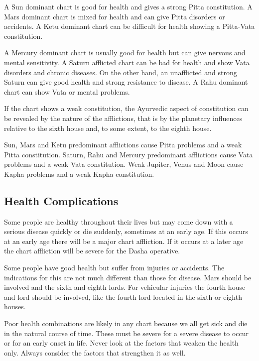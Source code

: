  

A Sun dominant chart is good for health and gives a strong Pitta constitution. A Mars dominant chart is mixed for health and can give Pitta disorders or accidents. A Ketu dominant chart can be difficult for health showing a Pitta-Vata constitution.

 

A Mercury dominant chart is usually good for health but can give nervous and mental sensitivity. A Saturn afflicted chart can be bad for health and show Vata disorders and chronic diseases. On the other hand, an unafflicted and strong Saturn can give good health and strong resistance to disease. A Rahu dominant chart can show Vata or mental problems.

 

If the chart shows a weak constitution, the Ayurvedic aspect of constitution can be revealed by the nature of the afflictions, that is by the planetary influences relative to the sixth house and, to some extent, to the eighth house.

 

Sun, Mars and Ketu predominant afflictions cause Pitta problems and a weak Pitta constitution. Saturn, Rahu and Mercury predominant afflictions cause Vata problems and a weak Vata constitution. Weak Jupiter, Venus and Moon cause Kapha problems and a weak Kapha constitution.

 

\subsection{Health Complications}
 

Some people are healthy throughout their lives but may come down with a serious disease quickly or die suddenly, sometimes at an early age. If this occurs at an early age there will be a major chart affliction. If it occurs at a later age the chart affliction will be severe for the Dasha operative.

 

Some people have good health but suffer from injuries or accidents. The indications for this are not much different than those for disease. Mars should be involved and the sixth and eighth lords. For vehicular injuries the fourth house and lord should be involved, like the fourth lord located in the sixth or eighth houses.

 

Poor health combinations are likely in any chart because we all get sick and die in the natural course of time. These must be severe for a severe disease to occur or for an early onset in life. Never look at the factors that weaken the health only. Always consider the factors that strengthen it as well.

